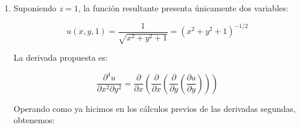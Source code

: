 \documentclass[
  spanish,
  a4paper,
]{scrreport}
\theoremstyle{definition}
\theoremstyle{remark}
\begin{document}
\begin{tcolorbox}
\begin{enumerate}
  \[
  \vec \nabla u = \vec 0 \Leftrightarrow \left( {\frac{{\partial
  u}}{{\partial x}},\frac{{\partial u}}{{\partial y}},\frac{{\partial
  u}}{{\partial z}}} \right) = \left( {0,0,0} \right)
  \]

  Por lo tanto, tenemos un sistema no lineal de tres ecuaciones con tres
  incógnitas:

  \[
  - x\left( {x^2  + y^2  + z^2 } \right)^{ - 3/2}  = 0
  \]

  \[
  - y\left( {x^2  + y^2  + z^2 } \right)^{ - 3/2}  = 0
  \]

  \[
  - z\left( {x^2  + y^2  + z^2 } \right)^{ - 3/2}  = 0
  \]

  Y teniendo en cuenta que el término \((x^2+y^2+z^2)\), por tratarse de
  una suma de cuadrados, únicamente puede ser 0 si \(x=y=z=0\); y a
  igual conclusión llegamos si suponemos que es distinto de 0, ya que
  entonces la primera ecuación implica que necesariamente \(x=0\), la
  segunda implica que \(y=0\), y la tercera implica que \(z=0\). Por lo
  tanto, concluimos que el único punto en el que el crecimiento puede
  ser nulo es \((x,y,z)=(0,0,0)\), pero dicho punto no pertenece al
  dominio de definición de la función (tendríamos un cero como
  denominador de una fracción), por lo que no hay ningún punto en el que
  la función presente un crecimiento nulo.
\item
  Suponiendo \(z=1\), la función resultante presenta únicamente dos
  variables:

  \[
   u(x,y,1) = \frac{1}{{\sqrt {x^2  + y^2  + 1} }} = \left( {x^2  + y^2
   + 1} \right)^{ - 1/2}
   \]

  La derivada propuesta es:

  \[
   \frac{{\partial ^4 u}}{{\partial x^2 \partial y^2 }} =
   \frac{\partial }{{\partial x}}\left( {\frac{\partial }{{\partial
   x}}\left( {\frac{\partial }{{\partial y}}\left( {\frac{{\partial
   u}}{{\partial y}}} \right)} \right)} \right)
   \]

  Operando como ya hicimos en los cálculos previos de las derivadas
  segundas, obtenemos:


\end{enumerate}
\end{tcolorbox}
\end{document}
